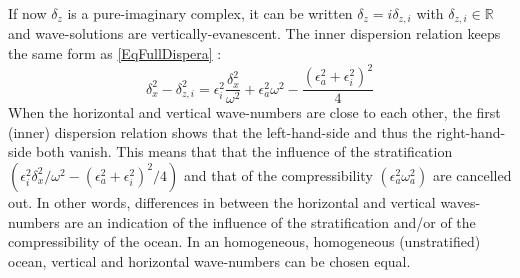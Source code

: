 \documentclass[a4paper,11pt]{article}
\begin{document}
If now $\delta_z$ is a pure-imaginary complex, it can be written $\delta_z=i\delta_{z,i}$ with $\delta_{z,i}\in\mathbb{R}$ and wave-solutions are vertically-evanescent. The inner  dispersion relation keeps the same form as \ref{EqFullDispera} :
\begin{equation}
	\label{EqFullDisperai}
 		\delta_x^2-\delta_{z,i}^2 =\epsilon_i^2\frac{\delta_x^2}
 			{\omega^2}+\epsilon_a^2\omega^2-\frac{(\epsilon_a^2+\epsilon_i^2)^2}{4}
\end{equation}
When the horizontal and vertical wave-numbers are close to each other, the first (inner) dispersion relation shows that the left-hand-side and thus the right-hand-side both vanish. This means that that the influence of the stratification $(\epsilon_i^2\delta_x^2/\omega^2-(\epsilon_a^2+\epsilon_i^2)^2/4)$ and that of the compressibility $(\epsilon_a^2\omega_a^2)$ are cancelled out. In other words, differences in between the horizontal and vertical waves-numbers are an indication of the influence of the stratification and/or of the compressibility of the ocean. In an homogeneous, homogeneous (unstratified) ocean, vertical and horizontal wave-numbers can be chosen equal.\\
\end{document}
